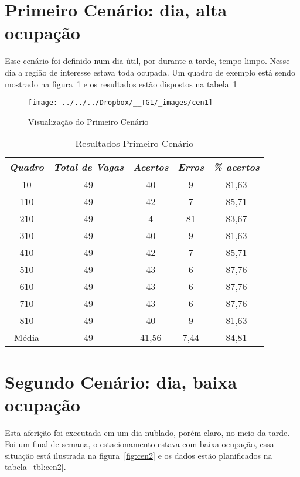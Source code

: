 \documentclass[ecp,tc]{iiufrgs}
\begin{document}
\section{Primeiro Cenário: dia, alta ocupação}

Esse cenário foi definido num dia útil, por durante a tarde, tempo limpo. Nesse dia a região de interesse estava toda ocupada. Um quadro de exemplo está sendo mostrado na figura~\ref{fig:cen1} e os resultados estão dispostos na tabela~\ref{tbl:cen1}

\begin{figure}
	\centering
	\caption{Visualização do Primeiro Cenário}
	\texttt{[image: ../../../Dropbox/\_\_TG1/\_images/cen1]}
	\label{fig:cen1}
\end{figure}

\begin{table}
	\caption{Resultados Primeiro Cenário}
	\begin{center}
		\begin{tabular}{c|c|c|c|c}
			\textit{Quadro}  &   \textit{Total de Vagas}  &   \textit{Acertos} & \textit{Erros} & \textit{\% acertos} \\
			\hline
			\hline
			10 & 49 & 40 & 9 & 81,63 \\
			\hline
			110 & 49 & 42 & 7 &  85,71 \\
			\hline
			210 & 49 & 4 & 81 & 83,67 \\
			\hline
			310 & 49 & 40 & 9 & 81,63 \\
			\hline
			410 & 49 & 42 & 7& 85,71 \\
			\hline
			510 & 49 & 43 & 6 & 87,76 \\
			\hline
			610 & 49 & 43 & 6 & 87,76 \\
			\hline
			710 & 49 & 43 & 6 & 87,76 \\
			\hline
			810 & 49 & 40 & 9 & 81,63 \\
			\hline
			Média & 49 & 41,56 & 7,44 & 84,81 \\
			\hline
		\end{tabular}
	\end{center}
	\label{tbl:cen1}
\end{table}


\section{Segundo Cenário: dia, baixa ocupação}

Esta aferição foi executada em um dia nublado, porém claro, no meio da tarde. Foi um final de semana, o estacionamento estava com baixa ocupação, essa situação está ilustrada na figura~\ref{fig:cen2} e os dados estão planificados na tabela~\ref{tbl:cen2}.
\end{document}
